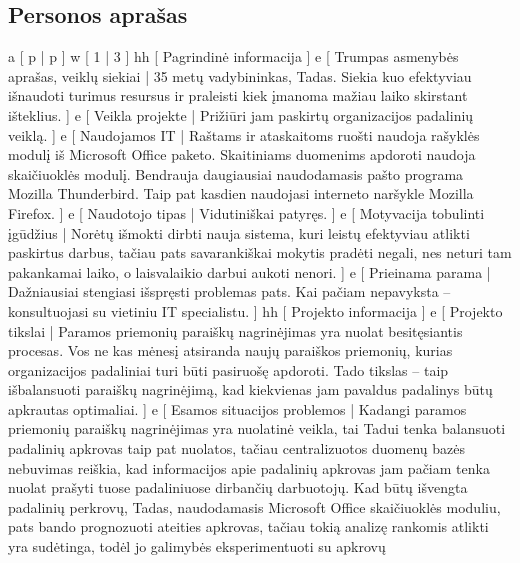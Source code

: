 \subsection{Personos aprašas}
\xtableu
{
  a [ p | p ]
  w [ 1 | 3 ]
  hh [ Pagrindinė informacija ]
  e [ Trumpas asmenybės aprašas, veiklų siekiai 
  | 
    35 metų vadybininkas, Tadas. Siekia kuo efektyviau išnaudoti turimus resursus ir praleisti
    kiek įmanoma mažiau laiko skirstant išteklius.
  ]
  e [ Veikla projekte 
  | 
    Prižiūri jam paskirtų organizacijos padalinių veiklą.
  ]
  e [ Naudojamos IT 
  | 
    Raštams ir ataskaitoms ruošti naudoja rašyklės modulį iš Microsoft Office paketo. Skaitiniams
    duomenims apdoroti naudoja skaičiuoklės modulį. Bendrauja daugiausiai naudodamasis pašto
    programa Mozilla Thunderbird. Taip pat kasdien naudojasi interneto naršykle Mozilla Firefox.
  ]
  e [ Naudotojo tipas 
  | 
    Vidutiniškai patyręs. 
  ]
  e [ Motyvacija tobulinti įgūdžius 
  |
    Norėtų išmokti dirbti nauja sistema, kuri leistų efektyviau atlikti paskirtus darbus, tačiau
    pats savarankiškai mokytis pradėti negali, nes neturi tam pakankamai laiko, o
    laisvalaikio darbui aukoti nenori.
  ]
  e [ Prieinama parama 
  | 
    Dažniausiai stengiasi išspręsti problemas pats. Kai pačiam
    nepavyksta – konsultuojasi su vietiniu IT specialistu.
  ]
  hh [ Projekto informacija ]
  e [ Projekto tikslai 
  | 
    Paramos priemonių paraiškų nagrinėjimas yra nuolat besitęsiantis procesas. Vos ne
    kas mėnesį atsiranda naujų paraiškos priemonių, kurias organizacijos padaliniai turi būti
    pasiruošę apdoroti. Tado tikslas – taip išbalansuoti paraiškų nagrinėjimą, kad kiekvienas
    jam pavaldus padalinys būtų apkrautas optimaliai.
  ]
  e [ Esamos situacijos problemos 
  | 
    Kadangi paramos priemonių paraiškų nagrinėjimas yra nuolatinė
    veikla, tai Tadui tenka  balansuoti padalinių apkrovas taip pat
    nuolatos, tačiau centralizuotos duomenų bazės nebuvimas reiškia,
    kad informacijos apie padalinių apkrovas jam pačiam tenka
    nuolat prašyti tuose padaliniuose dirbančių darbuotojų.
    Kad būtų išvengta padalinių perkrovų, Tadas, naudodamasis
    Microsoft Office skaičiuoklės moduliu, pats bando prognozuoti
    ateities apkrovas, tačiau tokią analizę rankomis atlikti yra
    sudėtinga, todėl jo galimybės eksperimentuoti su apkrovų
}
